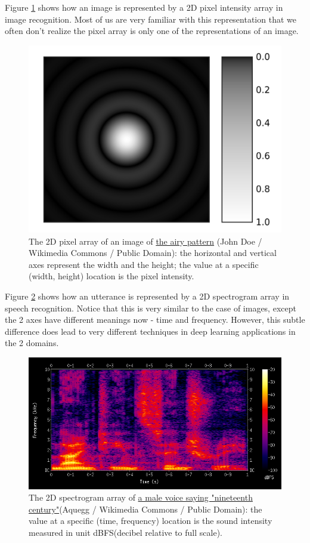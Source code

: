 \documentclass{article}
\begin{document}
Figure \ref{fig:Airy-pattern} shows how an image is represented by a 2D pixel intensity array in image recognition. Most of us are very familiar with this representation that we often don't realize the pixel array is only one of the representations of an image.

\begin{figure}
	\centering
	\includegraphics[width=0.5\linewidth]{Airy-pattern}
	\caption{The 2D pixel array of an image of  \href{https://commons.wikimedia.org/wiki/File:Airy-pattern.svg}{the airy pattern} (John Doe / Wikimedia Commons / Public Domain): the horizontal and vertical axes represent the width and the height; the value at a specific (width, height) location is the pixel intensity.}
	\label{fig:Airy-pattern}
\end{figure}

Figure \ref{fig:Spectrogram-19thC} shows how an utterance is represented by a 2D spectrogram array in speech recognition. Notice that this is very similar to the case of images, except the 2 axes have different meanings now - time and frequency. However, this subtle difference does lead to very different techniques in deep learning applications in the 2 domains.

\begin{figure}
	\includegraphics[width=\linewidth]{Spectrogram-19thC}
	\caption{The 2D spectrogram array of \href{https://commons.wikimedia.org/wiki/File:Spectrogram-19thC.png}{a male voice saying "nineteenth century"}(Aquegg / Wikimedia Commons / Public Domain): the value at a specific (time, frequency) location is the sound intensity measured in unit dBFS(decibel relative to full scale).}
	\label{fig:Spectrogram-19thC}
\end{figure}
\end{document}
